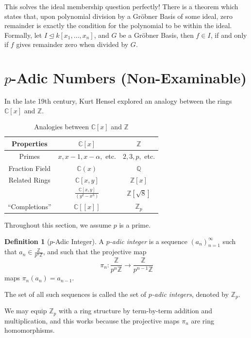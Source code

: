 \documentclass{article}
\theoremstyle{definition}
\newtheorem{definition}[theorem]{Definition}
\theoremstyle{remark}
\newcommand{\pqty}[1]{\left(#1\right)}
\newcommand{\bqty}[1]{\left[#1\right]}
\newcommand{\bbrac}[1]{[\![#1]\!]}
\newcommand{\flatfrac}[2]{\frac{#1}{#2}}
\newcommand{\functiondomain}[3]{#1:#2\to #3}
\newcommand{\idealsub}{\trianglelefteq}
\newcommand{\ZZ}{\mathbb{Z}}
\newcommand{\QQ}{\mathbb{Q}}
\newcommand{\CC}{\mathbb{C}}
\begin{document}
This solves the ideal membership question perfectly! There is a theorem which states that, upon polynomial division by a Gr\"{o}bner Basis of some ideal, zero remainder is exactly the condition for the polynomial to be within the ideal. Formally, let \(I \idealsub k\bqty{x_1, \ldots , x_n}\), and \(G\) be a Gr\"{o}bner Basis, then \(f \in I\), if and only if \(f\) gives remainder zero when divided by \(G\).
\section{\(p\)-Adic Numbers (Non-Examinable)}

In the late 19th century, Kurt Hensel explored an analogy between the rings \(\CC\bqty{x}\) and \(\ZZ\).

\begin{table}[ht!]
    \centering
    \begin{tabular}{c|cc}
        Properties & \(\CC\bqty{x}\) & \(\ZZ\) \\
        \hline\hline
        Primes & \(x, x - 1, x - \alpha, \) etc. & \(2, 3, p, \) etc. \\
        Fraction Field & \(\CC\pqty{x}\) & \(\QQ\) \\
        Related Rings & \(\CC\bqty{x, y}\) & \(\ZZ\bqty{x}\) \\
         & \(\flatfrac{\CC\bqty{x, y}}{\pqty{y^2 - x^3}}\) & \(\ZZ\bqty{\sqrt{8}}\) \\
        ``Completions'' & \(\CC\bbrac{x}\) & \(\ZZ_p\)
    \end{tabular}
    \caption{Analogies between \(\CC\bqty{x}\) and \(\ZZ\)}
    \label{tab:analogy-cx-z}
\end{table}

Throughout this section, we assume \(p\) is a prime.

\begin{definition}[\(p\)-Adic Integer]
    \label{def:p-adic-integer}%
    A \emph{\(p\)-adic integer} is a sequence \(\pqty{a_n}_{n = 1}^{\infty}\) such that \(a_n \in \flatfrac{\ZZ}{p^n \ZZ}\), and such that the projective map
    \[
        \functiondomain{\pi_n}{\flatfrac{\ZZ}{p^n \ZZ}}{\flatfrac{\ZZ}{p^{n - 1} \ZZ}}
    \]
    maps \(\pi_n \pqty{a_n} = a_{n - 1}\).

    The set of all such sequences is called the set of \emph{\(p\)-adic integers}, denoted by \(\ZZ_p\).
\end{definition}

We may equip \(\ZZ_p\) with a ring structure by term-by-term addition and multiplication, and this works because the projective maps \(\pi_n\) are ring homomorphisms.
\end{document}
